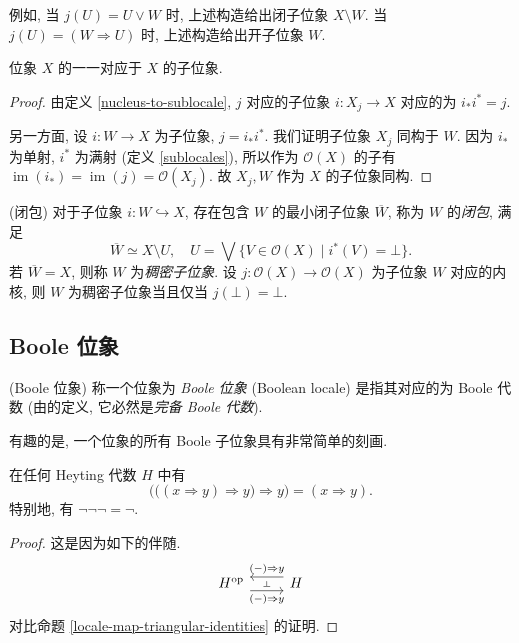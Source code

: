 例如, 当 $j(U) = U\lor W$ 时, 上述构造给出闭子位象 $X\setminus W$. 当 $j(U) = (W\Rightarrow U)$ 时, 上述构造给出开子位象 $W$.

\begin{prop}
	{}
	位象 $X$ 的\nc{}一一对应于 $X$ 的子位象.
\end{prop}
\begin{proof}
	由定义 \ref{nucleus-to-sublocale}, \nc{} $j$ 对应的子位象 $i\colon X_j\to X$ 对应的\nc{}为 $i_*i^* = j$.
	
	另一方面, 设 $i\colon W\to X$ 为子位象, $j=i_*i^*$. 我们证明子位象 $X_j$ 同构于 $W$.
	因为 $i_*$ 为单射, $i^*$ 为满射 (定义 \ref{sublocales}),
	所以作为 $\mathcal O(X)$ 的子\fm{}有 $\operatorname{im}(i_*) = \operatorname{im}(j)=\mathcal O(X_j)$.
	故 $X_j, W$ 作为 $X$ 的子位象同构.
\end{proof}


\begin{propdef}
	{(闭包)}
	对于子位象 $i\colon W \hookrightarrow X$, 存在包含 $W$ 的最小闭子位象 $\overline{W}$, 称为 $W$ 的\emph{闭包},
	满足
	\[
	\overline{W} \simeq X\setminus U,\quad U= \bigvee \{V\in\mathcal O(X)\mid i^*(V) =\bot\}.
	\]
	若 $\overline{W} = X$, 则称 $W$ 为\emph{稠密子位象}.
	设 $j\colon \mathcal O(X)\to\mathcal O(X)$ 为子位象 $W$ 对应的内核, 则 $W$ 为稠密子位象当且仅当 $j(\bot) = \bot$.
\end{propdef}

\subsection{Boole 位象}

\begin{definition}
	[label={Boolean-locale}]
	{(Boole 位象)}
	称一个位象为 \emph{Boole 位象} (Boolean locale) 是指其对应的\fm{}为 Boole 代数 (由\fm{}的定义, 它必然是\emph{完备 Boole 代数}).
\end{definition}

有趣的是, 一个位象的所有 Boole 子位象具有非常简单的刻画.

\newcommand{\booleansublocale}[1]{\text{B}(#1)}

\begin{prop}
	[label={xyyy-xy}]
	{}
	在任何 Heyting 代数 $H$ 中有
	\[
	\Big(\big((x\Rightarrow y) \Rightarrow y\big) \Rightarrow y\Big) = (x\Rightarrow y).
	\]
	特别地, 有 $\neg\neg\neg = \neg$.
\end{prop}
\begin{proof}
	这是因为如下的伴随.
	\[\begin{tikzcd}
		{H^{\op}} & {H}
		\arrow[""{name=0, anchor=center, inner sep=0}, "(-)\Rightarrow y"', shift right=2, from=1-1, to=1-2]
		\arrow[""{name=1, anchor=center, inner sep=0}, "(-)\Rightarrow y"', shift right=2, from=1-2, to=1-1]
		\arrow["\dashv"{anchor=center, rotate=-90}, draw=none, from=1, to=0]
	\end{tikzcd}\]
	对比命题 \ref{locale-map-triangular-identities} 的证明.
\end{proof}

